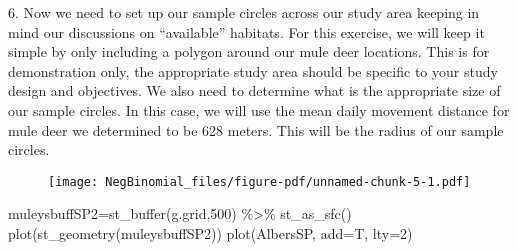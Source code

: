 \documentclass[
  letterpaper,
]{book}
\newenvironment{Shaded}{\begin{snugshade}}{\end{snugshade}}
\newcommand{\AttributeTok}[1]{\textcolor[rgb]{0.40,0.45,0.13}{#1}}
\newcommand{\CommentTok}[1]{\textcolor[rgb]{0.37,0.37,0.37}{#1}}
\newcommand{\DecValTok}[1]{\textcolor[rgb]{0.68,0.00,0.00}{#1}}
\newcommand{\FunctionTok}[1]{\textcolor[rgb]{0.28,0.35,0.67}{#1}}
\newcommand{\NormalTok}[1]{\textcolor[rgb]{0.00,0.23,0.31}{#1}}
\newcommand{\OtherTok}[1]{\textcolor[rgb]{0.00,0.23,0.31}{#1}}
\newcommand{\SpecialCharTok}[1]{\textcolor[rgb]{0.37,0.37,0.37}{#1}}
\newcommand{\StringTok}[1]{\textcolor[rgb]{0.13,0.47,0.30}{#1}}
\begin{document}
6. Now we need to set up our sample circles across our study area
keeping in mind our discussions on ``available'' habitats. For this
exercise, we will keep it simple by only including a polygon around our
mule deer locations. This is for demonstration only, the appropriate
study area should be specific to your study design and objectives. We
also need to determine what is the appropriate size of our sample
circles. In this case, we will use the mean daily movement distance for
mule deer we determined to be 628 meters. This will be the radius of our
sample circles.

\begin{Shaded}
\end{Shaded}

\begin{figure}[H]

{\centering \texttt{[image: NegBinomial\_files/figure-pdf/unnamed-chunk-5-1.pdf]}

}

\end{figure}

\begin{Shaded}
\begin{Highlighting}[]
\NormalTok{muleysbuffSP2}\OtherTok{=}\FunctionTok{st\_buffer}\NormalTok{(g.grid,}\DecValTok{500}\NormalTok{) }\SpecialCharTok{\%\textgreater{}\%} \FunctionTok{st\_as\_sfc}\NormalTok{()}
\FunctionTok{plot}\NormalTok{(}\FunctionTok{st\_geometry}\NormalTok{(muleysbuffSP2))}
\FunctionTok{plot}\NormalTok{(AlbersSP, }\AttributeTok{add=}\NormalTok{T, }\AttributeTok{lty=}\DecValTok{2}\NormalTok{)}
\end{Highlighting}
\end{Shaded}
\end{document}
